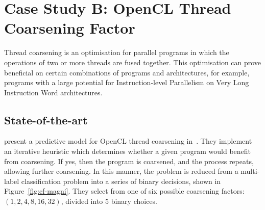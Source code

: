 \section{Case Study B: OpenCL Thread Coarsening Factor}
\label{sec:deeptune-case-study-b}

Thread coarsening is an optimisation for parallel programs in which the operations of two or more threads are fused together. This optimisation can prove beneficial on certain combinations of programs and architectures, for example, programs with a large potential for Instruction-level Parallelism on Very Long Instruction Word architectures.

\subsection{State-of-the-art} \citeauthor{Magni2014} present a predictive model for OpenCL thread coarsening in~\cite{Magni2014}. They implement an iterative heuristic which determines whether a given program would benefit from coarsening. If yes, then the program is coarsened, and the process repeats, allowing further coarsening. In this manner, the problem is reduced from a multi-label classification problem into a series of binary decisions, shown in Figure~\ref{fig:cf-magni}. They select from one of six possible coarsening factors: $(1, 2, 4, 8, 16, 32)$, divided into 5 binary choices.

